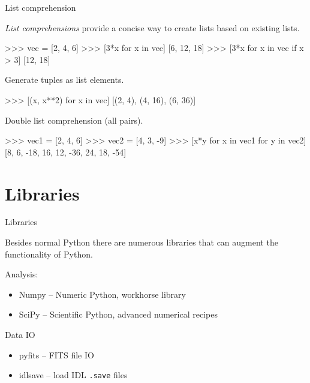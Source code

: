 \documentclass[xetex,10pt]{beamer}
\begin{document}
\begin{frame}[fragile]{List comprehension}

\emph{List comprehensions} provide a concise way to create lists based on existing lists.
	
\begin{python}
>>> vec = [2, 4, 6]
>>> [3*x for x in vec]
[6, 12, 18]
>>> [3*x for x in vec if x > 3]
[12, 18]
\end{python}

Generate tuples as list elements.

\begin{python}
>>> [(x, x**2) for x in vec]
[(2, 4), (4, 16), (6, 36)]
\end{python}

Double list comprehension (all pairs).

\begin{python}
>>> vec1 = [2, 4, 6]
>>> vec2 = [4, 3, -9]
>>> [x*y for x in vec1 for y in vec2]
[8, 6, -18, 16, 12, -36, 24, 18, -54]
\end{python}

\end{frame}

\section{Libraries}

\begin{frame}[fragile]{Libraries}

Besides normal Python there are numerous libraries that can augment the functionality of Python.

	\vspace*{1em}

Analysis:
\begin{itemize}
\item Numpy -- Numeric Python, workhorse library
\item SciPy -- Scientific Python, advanced numerical recipes
\end{itemize}

	\vspace*{1em}

Data IO
\begin{itemize}
\item pyfits -- FITS file IO
\item idlsave -- load IDL \texttt{.save} files
\end{itemize}

	\vspace*{1em}
\end{frame}
\end{document}

